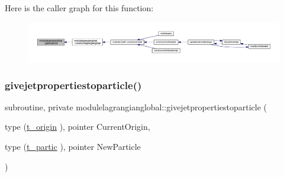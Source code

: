 Here is the caller graph for this function\+:\nopagebreak
\begin{figure}[H]
\begin{center}
\leavevmode
\includegraphics[width=350pt]{namespacemodulelagrangianglobal_a64f08b972c519197b497942c12d54fd5_icgraph}
\end{center}
\end{figure}
\mbox{\label{namespacemodulelagrangianglobal_a24724892759ef0c6bdbe24cb1ecfd00b}} 
\subsubsection{\texorpdfstring{givejetpropertiestoparticle()}{givejetpropertiestoparticle()}}
{\footnotesize\ttfamily subroutine, private modulelagrangianglobal\+::givejetpropertiestoparticle (\begin{DoxyParamCaption}\item[{type (\mbox{\hyperlink{structmodulelagrangianglobal_1_1t__origin}{t\+\_\+origin}} ), pointer}]{Current\+Origin,  }\item[{type (\mbox{\hyperlink{structmodulelagrangianglobal_1_1t__partic}{t\+\_\+partic}} ), pointer}]{New\+Particle }\end{DoxyParamCaption})\hspace{0.3cm}{\ttfamily [private]}}


